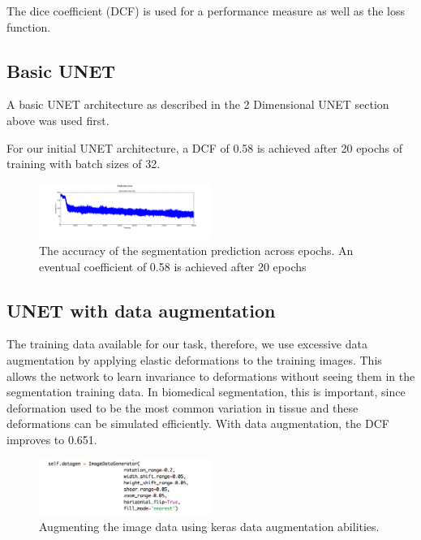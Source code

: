 \documentclass[letterpaper]{article}
\begin{document}
The dice coefficient (DCF) is used for a performance measure as well as the loss function. 

\subsection{Basic UNET}
A basic UNET architecture as described in the 2 Dimensional UNET section above was used first. 

For our initial UNET architecture, a DCF of 0.58 is achieved after 20 epochs of training with batch sizes of 32. 

 \begin{figure}[H]
  \centerline{\includegraphics[width=0.5\textwidth]{Plots/AverageErrorKullEvery5000.png}}
  \caption{The accuracy of the segmentation prediction across epochs. An eventual coefficient of 0.58 is achieved after 20 epochs}
  \label{fig:trainingovertime.}
\end{figure}

\subsection{UNET with data augmentation}

The training data available for our task, therefore, we use excessive data augmentation by applying elastic deformations to the training images. This allows the network to learn invariance to deformations without seeing them in the segmentation training data. In biomedical segmentation, this is important, since deformation used to be the most common variation in tissue and these deformations can be simulated efficiently. With data augmentation, the DCF improves to 0.651.

 \begin{figure}[H]
  \centerline{\includegraphics[width=0.5\textwidth]{Images/KerasDataAugmentation.png}}
  \caption{Augmenting the image data using keras data augmentation abilities.}
  \label{fig:unet3}
\end{figure}
\end{document}
